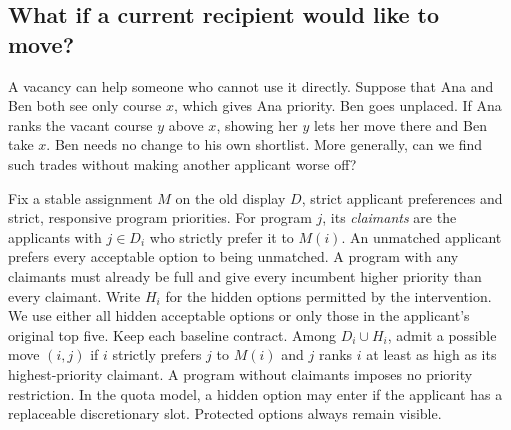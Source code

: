 \subsection{What if a current recipient would like to move?}\label{sec:vacancy-chains}
A vacancy can help someone who cannot use it directly. Suppose that Ana and Ben both see only course $x$, which gives Ana priority. Ben goes unplaced. If Ana ranks the vacant course $y$ above $x$, showing her $y$ lets her move there and Ben take $x$. Ben needs no change to his own shortlist. More generally, can we find such trades without making another applicant worse off?

Fix a stable assignment $M$ on the old display $D$, strict applicant preferences and strict, responsive program priorities. For program $j$, its \emph{claimants} are the applicants with $j\in D_i$ who strictly prefer it to $M(i)$. An unmatched applicant prefers every acceptable option to being unmatched. A program with any claimants must already be full and give every incumbent higher priority than every claimant. Write $H_i$ for the hidden options permitted by the intervention. We use either all hidden acceptable options or only those in the applicant's original top five. Keep each baseline contract. Among $D_i\cup H_i$, admit a possible move $(i,j)$ if $i$ strictly prefers $j$ to $M(i)$ and $j$ ranks $i$ at least as high as its highest-priority claimant. A program without claimants imposes no priority restriction. In the quota model, a hidden option may enter if the applicant has a replaceable discretionary slot. Protected options always remain visible.

